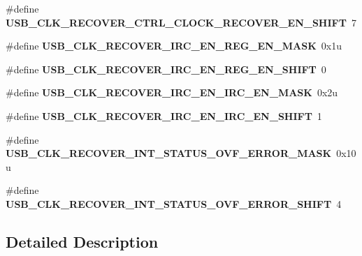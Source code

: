 \begin{DoxyCompactItemize}
\item 
\#define {\bfseries U\+S\+B\+\_\+\+C\+L\+K\+\_\+\+R\+E\+C\+O\+V\+E\+R\+\_\+\+C\+T\+R\+L\+\_\+\+C\+L\+O\+C\+K\+\_\+\+R\+E\+C\+O\+V\+E\+R\+\_\+\+E\+N\+\_\+\+S\+H\+I\+FT}~7\hypertarget{group__USB__Register__Masks_ga0be4a3f8e9d2306f64ebe6b47216524d}{}\label{group__USB__Register__Masks_ga0be4a3f8e9d2306f64ebe6b47216524d}

\item 
\#define {\bfseries U\+S\+B\+\_\+\+C\+L\+K\+\_\+\+R\+E\+C\+O\+V\+E\+R\+\_\+\+I\+R\+C\+\_\+\+E\+N\+\_\+\+R\+E\+G\+\_\+\+E\+N\+\_\+\+M\+A\+SK}~0x1u\hypertarget{group__USB__Register__Masks_ga7e948ea51eeee58403c13f4c040ddb55}{}\label{group__USB__Register__Masks_ga7e948ea51eeee58403c13f4c040ddb55}

\item 
\#define {\bfseries U\+S\+B\+\_\+\+C\+L\+K\+\_\+\+R\+E\+C\+O\+V\+E\+R\+\_\+\+I\+R\+C\+\_\+\+E\+N\+\_\+\+R\+E\+G\+\_\+\+E\+N\+\_\+\+S\+H\+I\+FT}~0\hypertarget{group__USB__Register__Masks_ga988c7c957c1cb5e0b15d837f929da78b}{}\label{group__USB__Register__Masks_ga988c7c957c1cb5e0b15d837f929da78b}

\item 
\#define {\bfseries U\+S\+B\+\_\+\+C\+L\+K\+\_\+\+R\+E\+C\+O\+V\+E\+R\+\_\+\+I\+R\+C\+\_\+\+E\+N\+\_\+\+I\+R\+C\+\_\+\+E\+N\+\_\+\+M\+A\+SK}~0x2u\hypertarget{group__USB__Register__Masks_ga0ec64449ae278fc895d80fe9d85882be}{}\label{group__USB__Register__Masks_ga0ec64449ae278fc895d80fe9d85882be}

\item 
\#define {\bfseries U\+S\+B\+\_\+\+C\+L\+K\+\_\+\+R\+E\+C\+O\+V\+E\+R\+\_\+\+I\+R\+C\+\_\+\+E\+N\+\_\+\+I\+R\+C\+\_\+\+E\+N\+\_\+\+S\+H\+I\+FT}~1\hypertarget{group__USB__Register__Masks_ga2e1faca39a2e63ef3c4939b39e8b10c0}{}\label{group__USB__Register__Masks_ga2e1faca39a2e63ef3c4939b39e8b10c0}

\item 
\#define {\bfseries U\+S\+B\+\_\+\+C\+L\+K\+\_\+\+R\+E\+C\+O\+V\+E\+R\+\_\+\+I\+N\+T\+\_\+\+S\+T\+A\+T\+U\+S\+\_\+\+O\+V\+F\+\_\+\+E\+R\+R\+O\+R\+\_\+\+M\+A\+SK}~0x10u\hypertarget{group__USB__Register__Masks_ga159e6afded3ea1fd5360f35010beef77}{}\label{group__USB__Register__Masks_ga159e6afded3ea1fd5360f35010beef77}

\item 
\#define {\bfseries U\+S\+B\+\_\+\+C\+L\+K\+\_\+\+R\+E\+C\+O\+V\+E\+R\+\_\+\+I\+N\+T\+\_\+\+S\+T\+A\+T\+U\+S\+\_\+\+O\+V\+F\+\_\+\+E\+R\+R\+O\+R\+\_\+\+S\+H\+I\+FT}~4\hypertarget{group__USB__Register__Masks_gad67bead4d081f4a50deb6bc8e024ffc7}{}\label{group__USB__Register__Masks_gad67bead4d081f4a50deb6bc8e024ffc7}

\end{DoxyCompactItemize}


\subsection{Detailed Description}
